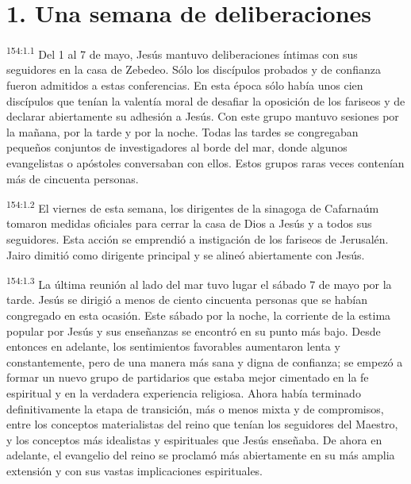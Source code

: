\section*{1. Una semana de deliberaciones}
\par 
\textsuperscript{154:1.1} Del 1 al 7 de mayo, Jesús mantuvo deliberaciones íntimas con sus seguidores en la casa de Zebedeo. Sólo los discípulos probados y de confianza fueron admitidos a estas conferencias. En esta época sólo había unos cien discípulos que tenían la valentía moral de desafiar la oposición de los fariseos y de declarar abiertamente su adhesión a Jesús. Con este grupo mantuvo sesiones por la mañana, por la tarde y por la noche. Todas las tardes se congregaban pequeños conjuntos de investigadores al borde del mar, donde algunos evangelistas o apóstoles conversaban con ellos. Estos grupos raras veces contenían más de cincuenta personas.

\par 
\textsuperscript{154:1.2} El viernes de esta semana, los dirigentes de la sinagoga de Cafarnaúm tomaron medidas oficiales para cerrar la casa de Dios a Jesús y a todos sus seguidores. Esta acción se emprendió a instigación de los fariseos de Jerusalén. Jairo dimitió como dirigente principal y se alineó abiertamente con Jesús.

\par 
\textsuperscript{154:1.3} La última reunión al lado del mar tuvo lugar el sábado 7 de mayo por la tarde. Jesús se dirigió a menos de ciento cincuenta personas que se habían congregado en esta ocasión. Este sábado por la noche, la corriente de la estima popular por Jesús y sus enseñanzas se encontró en su punto más bajo. Desde entonces en adelante, los sentimientos favorables aumentaron lenta y constantemente, pero de una manera más sana y digna de confianza; se empezó a formar un nuevo grupo de partidarios que estaba mejor cimentado en la fe espiritual y en la verdadera experiencia religiosa. Ahora había terminado definitivamente la etapa de transición, más o menos mixta y de compromisos, entre los conceptos materialistas del reino que tenían los seguidores del Maestro, y los conceptos más idealistas y espirituales que Jesús enseñaba. De ahora en adelante, el evangelio del reino se proclamó más abiertamente en su más amplia extensión y con sus vastas implicaciones espirituales.

